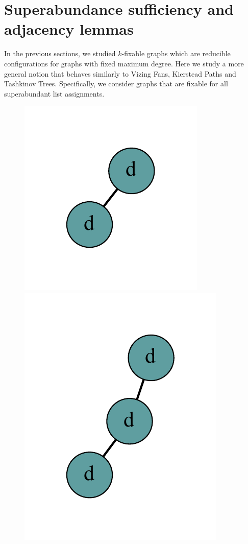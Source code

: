 \documentclass[12pt]{article}
\theoremstyle{plain}
\theoremstyle{definition}
\theoremstyle{remark}
\begin{document}
\section{Superabundance sufficiency and adjacency lemmas}
In the previous sections, we studied $k$-fixable graphs which are reducible configurations for graphs with fixed maximum degree.  Here we study a more general notion that behaves similarly to Vizing Fans, Kierstead Paths and Tashkinov Trees.  
Specifically, we consider graphs that are fixable for all superabundant list assignments.  

	\begin{figure}[htb]
		\centering
		\includegraphics[scale=0.5]{Superabundance/all/1[1,1].pdf}
		\includegraphics[scale=0.5]{Superabundance/all/011[1,1,2].pdf}

\end{figure}
\end{document}
